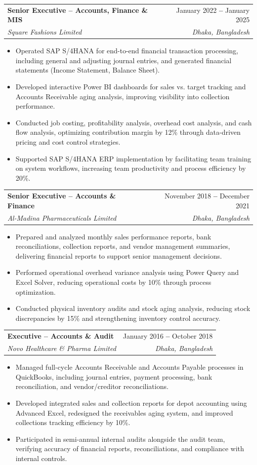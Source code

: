 \documentclass[letterpaper,11pt]{article}
\makeatletter
\newcommand{\resumeItem}[1]{
  \item\small{
    {#1 \vspace{-3pt}}
  }
}
\newcommand{\resumeSubheading}[4]{
  \vspace{-3pt}\item
    \begin{tabular*}{0.97\textwidth}[t]{l@{\extracolsep{\fill}}r}
      \textbf{#1} & #2 \\
      \textit{\small#3} & \textit{\small #4} \\
    \end{tabular*}\vspace{-3pt}
}
\newcommand{\resumeItemListStart}{\begin{itemize}}
\newcommand{\resumeItemListEnd}{\end{itemize}\vspace{-3pt}}
\makeatother
\begin{document}
    \resumeSubheading
      {Senior Executive -- Accounts, Finance \& MIS}{January 2022 \textbf{--} January 2025} 
      {Square Fashions Limited}{Dhaka, Bangladesh}
      \resumeItemListStart
        \resumeItem{Operated SAP S/4HANA for end-to-end financial transaction processing, including general and adjusting journal entries, and generated financial statements (Income Statement, Balance Sheet).}
        \resumeItem{Developed interactive Power BI dashboards for sales vs. target tracking and Accounts Receivable aging analysis, improving visibility into collection performance.}
        \resumeItem{Conducted job costing, profitability analysis, overhead cost analysis, and cash flow analysis, optimizing contribution margin by 12\% through data-driven pricing and cost control strategies.}
        \resumeItem{Supported SAP S/4HANA ERP implementation by facilitating team training on system workflows, increasing team productivity and process efficiency by 20\%.}
      \resumeItemListEnd
    \vspace{-5pt}

    \resumeSubheading
      {Senior Executive -- Accounts \& Finance}{November 2018 \textbf{--} December 2021}
      {Al-Madina Pharmaceuticals Limited}{Dhaka, Bangladesh}
      \resumeItemListStart
        \resumeItem{Prepared and analyzed monthly sales performance reports, bank reconciliations, collection reports, and vendor management summaries, delivering financial reports to support senior management decisions.}
        \resumeItem{Performed operational overhead variance analysis using Power Query and Excel Solver, reducing operational costs by 10\% through process optimization.}
        \resumeItem{Conducted physical inventory audits and stock aging analysis, reducing stock discrepancies by 15\% and strengthening inventory control accuracy.}
      \resumeItemListEnd
    \vspace{-5pt}

    \resumeSubheading
      {Executive -- Accounts \& Audit}{January 2016 \textbf{--} October 2018}
      {Novo Healthcare \& Pharma Limited}{Dhaka, Bangladesh}
      \resumeItemListStart
        \resumeItem{Managed full-cycle Accounts Receivable and Accounts Payable processes in QuickBooks, including journal entries, payment processing, bank reconciliation, and vendor/creditor reconciliations.}
        \resumeItem{Developed integrated sales and collection reports for depot accounting using Advanced Excel, redesigned the receivables aging system, and improved collections tracking efficiency by 10\%.}
        \resumeItem{Participated in semi-annual internal audits alongside the audit team, verifying accuracy of financial reports, reconciliations, and compliance with internal controls.}
      \resumeItemListEnd
\end{document}
